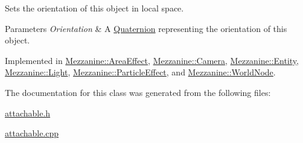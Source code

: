 Sets the orientation of this object in local space. 


\begin{DoxyParams}{Parameters}
{\em Orientation} & A \hyperlink{classMezzanine_1_1Quaternion}{Quaternion} representing the orientation of this object. \\
\hline
\end{DoxyParams}


Implemented in \hyperlink{classMezzanine_1_1AreaEffect_a59907341f2a0c8814b7962f010cea587}{Mezzanine::AreaEffect}, \hyperlink{classMezzanine_1_1Camera_a8857075c6bc9e4d40075652778aa14c2}{Mezzanine::Camera}, \hyperlink{classMezzanine_1_1Entity_a82485a3020bdba45744b094e08eaf087}{Mezzanine::Entity}, \hyperlink{classMezzanine_1_1Light_ac97ef9f7544c0710ce8c18dac91ec1ce}{Mezzanine::Light}, \hyperlink{classMezzanine_1_1ParticleEffect_a2ab1695b2261bb058f64ed246a3bfc35}{Mezzanine::ParticleEffect}, and \hyperlink{classMezzanine_1_1WorldNode_a32259918c2d5695141371ca364a813c2}{Mezzanine::WorldNode}.



The documentation for this class was generated from the following files:\begin{DoxyCompactItemize}
\item 
\hyperlink{attachable_8h}{attachable.h}\item 
\hyperlink{attachable_8cpp}{attachable.cpp}\end{DoxyCompactItemize}
